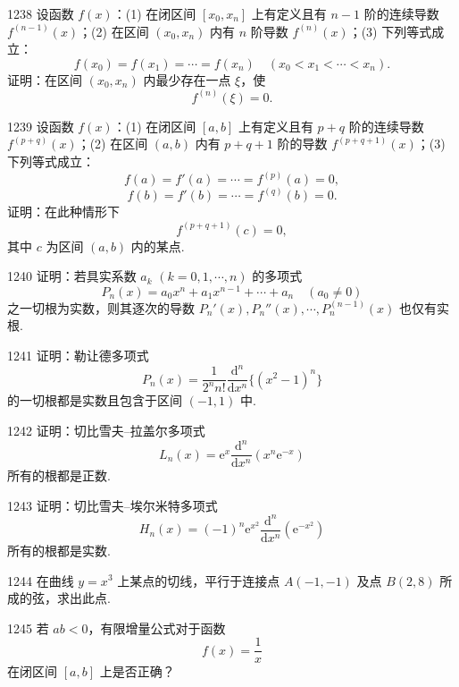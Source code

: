 \begin{prob}[M]{1238}
设函数 $f(x)$：(1) 在闭区间 $[x_0, x_n]$ 上有定义且有 $n - 1$ 阶的连续导数 $f^{(n-1)}(x)$；(2) 在区间 $(x_0, x_n)$ 内有 $n$ 阶导数 $f^{(n)}(x)$；(3) 下列等式成立：
\[
f(x_0) = f(x_1) = \cdots = f(x_n) \quad (x_0 < x_1 < \cdots < x_n).
\]
证明：在区间 $(x_0, x_n)$ 内最少存在一点 $\xi$，使
\[
f^{(n)}(\xi) = 0.
\]
\end{prob}

\begin{prob}[M]{1239}
设函数 $f(x)$：(1) 在闭区间 $[a, b]$ 上有定义且有 $p + q$ 阶的连续导数 $f^{(p+q)}(x)$；(2) 在区间 $(a, b)$ 内有 $p + q + 1$ 阶的导数 $f^{(p+q+1)}(x)$；(3) 下列等式成立：
\[
f(a) = f'(a) = \cdots = f^{(p)}(a) = 0,
\]
\[
f(b) = f'(b) = \cdots = f^{(q)}(b) = 0.
\]
证明：在此种情形下
\[
f^{(p+q+1)}(c) = 0,
\]
其中 $c$ 为区间 $(a, b)$ 内的某点.
\end{prob}

\begin{prob}[M]{1240}
证明：若具实系数 $a_k$ $(k = 0, 1, \cdots, n)$ 的多项式
\[
P_n(x) = a_0 x^n + a_1 x^{n-1} + \cdots + a_n \quad (a_0 \neq 0)
\]
之一切根为实数，则其逐次的导数 $P_n'(x), P_n''(x), \cdots, P_n^{(n-1)}(x)$ 也仅有实根.
\end{prob}

\begin{prob}[M]{1241}
证明：勒让德多项式
\[
P_n(x) = \frac{1}{2^n n!} \frac{\mathrm{d}^n}{\mathrm{d}x^n}\{(x^2 - 1)^n\}
\]
的一切根都是实数且包含于区间 $(-1, 1)$ 中.
\end{prob}

\begin{prob}[M]{1242}
证明：切比雪夫--拉盖尔多项式
\[
L_n(x) = \mathrm{e}^x \frac{\mathrm{d}^n}{\mathrm{d}x^n}(x^n \mathrm{e}^{-x})
\]
所有的根都是正数.
\end{prob}

\begin{prob}[M]{1243}
证明：切比雪夫--埃尔米特多项式
\[
H_n(x) = (-1)^n \mathrm{e}^{x^2} \frac{\mathrm{d}^n}{\mathrm{d}x^n}(\mathrm{e}^{-x^2})
\]
所有的根都是实数.
\end{prob}

\begin{prob}[S]{1244}
在曲线 $y = x^3$ 上某点的切线，平行于连接点 $A(-1, -1)$ 及点 $B(2, 8)$ 所成的弦，求出此点.
\end{prob}

\begin{prob}[S]{1245}
若 $ab < 0$，有限增量公式对于函数
\[
f(x) = \frac{1}{x}
\]
在闭区间 $[a, b]$ 上是否正确？
\end{prob}

